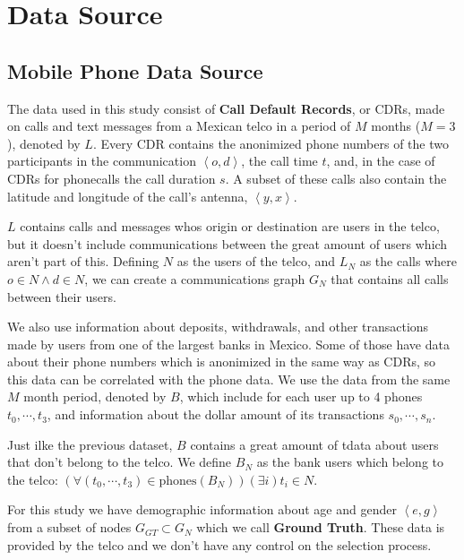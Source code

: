 \section{Data Source}

\subsection{Mobile Phone Data Source}


The data used in this study consist of \textbf{Call Default Records}, or CDRs, made on calls and text messages from a Mexican telco in a period of \( M \) months (\( M = 3 \)), denoted by \( L \). Every CDR contains the anonimized phone numbers of the two participants in the communication \(\left<o, d\right>\), the call time \( t \), and, in the case of CDRs for phonecalls the call duration \( s \). A subset of these calls also contain the latitude and longitude of the call's antenna, \( \left<y, x\right> \).

\( L \) contains calls and messages whos origin or destination are users in the telco, but it doesn't include communications between the great amount of users which aren't part of this. Defining \( N \) as the users of the telco, and \( L_N \) as the calls where \( o \in N \wedge d \in N \), we can create a communications graph \( G_N \) that contains all calls between their users.

We also use information about deposits, withdrawals, and other transactions made by users from one of the largest banks in Mexico. Some of those have data about their phone numbers which is anonimized in the same way as CDRs, so this data can be correlated with the phone data. We use the data from the same \( M \) month period, denoted by \( B \), which include for each user up to 4 phones \( t_0, \cdots, t_3 \), and information about the dollar amount of its transactions \( s_0, \cdots, s_n \).

Just ilke the previous dataset, \( B \) contains a great amount of tdata about users that don't belong to the telco. We define \( B_N \) as the bank users which belong to the telco: \( \left( \forall \left( t_0, \cdots, t_3 \right) \in \text{phones}\left( B_N \right) \right) \left( \exists i \right) t_i \in N \).

For this study we have demographic information about age and gender \( \left< e, g \right> \) from a subset of nodes \( G_{GT} \subset G_N \) which we call \textbf{Ground Truth}. These data is provided by the telco and we don't have any control on the selection process.

